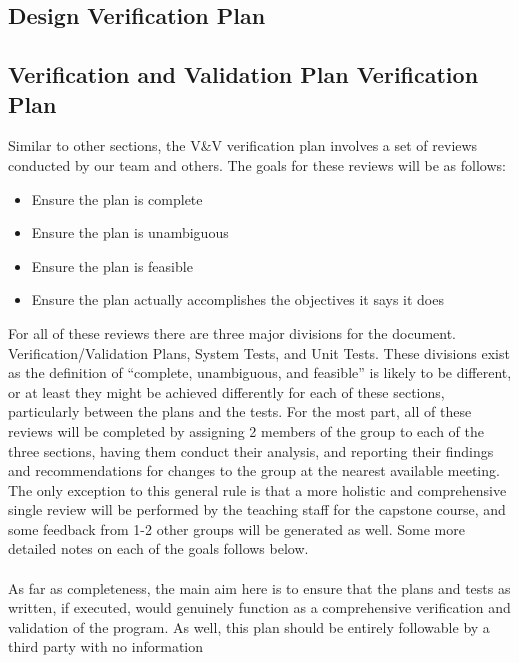 \documentclass[12pt, titlepage]{article}
\begin{document}
\subsection{Design Verification Plan}




\subsection{Verification and Validation Plan Verification Plan}
Similar to other sections, the V\&V verification plan involves a set of reviews conducted by our team and others. The goals for these reviews will be as follows:
\begin{itemize}
\item Ensure the plan is complete
\item	Ensure the plan is unambiguous
\item	Ensure the plan is feasible
\item	Ensure the plan actually accomplishes the objectives it says it does
\end{itemize} 
For all of these reviews there are three major divisions for the document. Verification/Validation Plans, System Tests, and Unit Tests. These divisions exist as the definition
of “complete, unambiguous, and feasible” is likely to be different, or at least they might be achieved differently for each of these sections, particularly between the plans
and the tests. For the most part, all of these reviews will be completed by assigning 2 members of the group to each of the three sections, having them conduct their analysis,
and reporting their findings and recommendations for changes to the group at the nearest available meeting. The only exception to this general rule is that a more holistic 
and comprehensive single review will be performed by the teaching staff for the capstone course, and some feedback from 1-2 other groups will be generated as well. 
Some more detailed notes on each of the goals follows below.\\\\ As far as completeness, the main aim here is to ensure that the plans and tests as written, if executed,
would genuinely function as a comprehensive verification and validation of the program. As well, this plan should be entirely followable by a third party with no information
\end{document}
